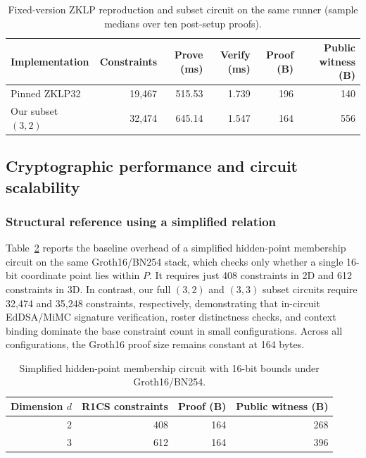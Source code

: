 \documentclass[pdflatex,iicol,sn-mathphys-num]{sn-jnl}
\theoremstyle{thmstyleone}
\begin{document}
\begin{table}[t]\centering\footnotesize
\caption{Fixed-version ZKLP reproduction and subset circuit on the same runner (sample medians over ten post-setup proofs).}\label{tab:zklp-repro}
\setlength{\tabcolsep}{3pt}
\begin{tabularx}{\linewidth}{@{}Xrrrrr@{}}\toprule
Implementation&Constraints&Prove (ms)&Verify (ms)&Proof (B)&Public witness (B)\\\midrule
Pinned ZKLP32&19,467&515.53&1.739&196&140\\
Our subset $(3,2)$&32,474&645.14&1.547&164&556\\\bottomrule
\end{tabularx}
\end{table}

\subsection{Cryptographic performance and circuit scalability}\label{sec:crypto-perf}
\subsubsection{Structural reference using a simplified relation}
Table~\ref{tab:point-zk} reports the baseline overhead of a simplified hidden-point membership circuit on the same Groth16/BN254 stack, which checks only whether a single 16-bit coordinate point lies within $P$. It requires just 408 constraints in 2D and 612 constraints in 3D. In contrast, our full $(3, 2)$ and $(3, 3)$ subset circuits require 32,474 and 35,248 constraints, respectively, demonstrating that in-circuit EdDSA/MiMC signature verification, roster distinctness checks, and context binding dominate the base constraint count in small configurations. Across all configurations, the Groth16 proof size remains constant at 164 bytes.

\begin{table}[t]\centering\small
\caption{Simplified hidden-point membership circuit with 16-bit bounds under Groth16/BN254.}\label{tab:point-zk}
\begin{tabular}{rrrr}\toprule
Dimension $d$&R1CS constraints&Proof (B)&Public witness (B)\\\midrule
2&408&164&268\\
3&612&164&396\\\bottomrule
\end{tabular}
\end{table}
\end{document}
